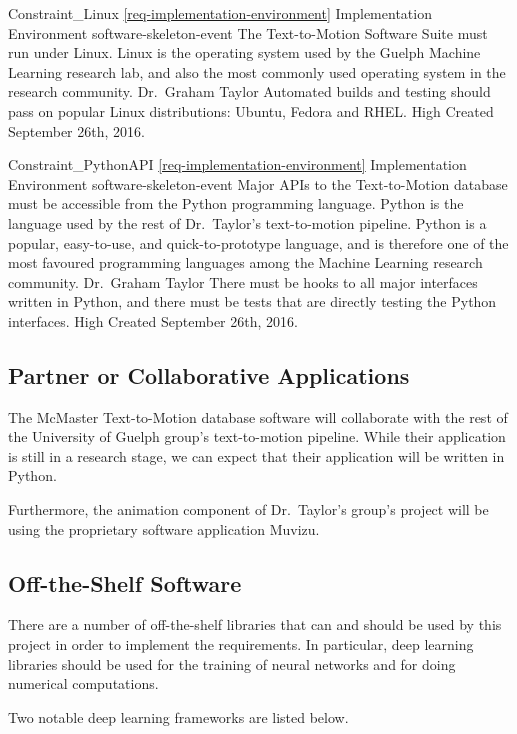 \documentclass{scrreprt}
\begin{document}
\requirement
{Constraint_Linux}
{\ref{req-implementation-environment} Implementation Environment}
{software-skeleton-event}
{The Text-to-Motion Software Suite must run under Linux.}
{Linux is the operating system used by the Guelph Machine Learning research
 lab, and also the most commonly used operating system in the research
 community.}
{Dr.\ Graham Taylor}
{Automated builds and testing should pass on popular Linux distributions:
 Ubuntu, Fedora and RHEL.}
{High}
{Created September 26th, 2016.}

\requirement
{Constraint_PythonAPI}
{\ref{req-implementation-environment} Implementation Environment}
{software-skeleton-event}
{Major APIs to the Text-to-Motion database must be accessible from the Python
 programming language.}
{Python is the language used by the rest of Dr.\ Taylor's text-to-motion
 pipeline. Python is a popular, easy-to-use, and quick-to-prototype language,
 and is therefore one of the most favoured programming languages among the
 Machine Learning research community.}
{Dr.\ Graham Taylor}
{There must be hooks to all major interfaces written in Python, and there must
 be tests that are directly testing the Python interfaces.}
{High}
{Created September 26th, 2016.}

\subsection{Partner or Collaborative Applications}

The McMaster Text-to-Motion database software will collaborate with the rest of
the University of Guelph group's text-to-motion pipeline. While their
application is still in a research stage, we can expect that their application
will be written in Python.

Furthermore, the animation component of Dr.\ Taylor's group's project will be
using the proprietary software application Muvizu.

\subsection{Off-the-Shelf Software}

There are a number of off-the-shelf libraries that can and should be used by
this project in order to implement the requirements. In particular, deep
learning libraries should be used for the training of neural networks and for
doing numerical computations.

Two notable deep learning frameworks are listed below.
\end{document}
